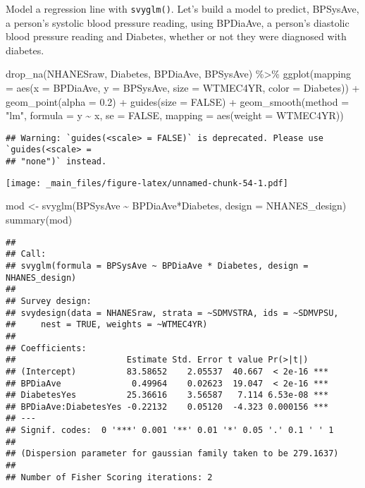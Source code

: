 \documentclass[
]{book}
\newenvironment{Shaded}{\begin{snugshade}}{\end{snugshade}}
\newcommand{\AttributeTok}[1]{\textcolor[rgb]{0.77,0.63,0.00}{#1}}
\newcommand{\ConstantTok}[1]{\textcolor[rgb]{0.00,0.00,0.00}{#1}}
\newcommand{\FloatTok}[1]{\textcolor[rgb]{0.00,0.00,0.81}{#1}}
\newcommand{\FunctionTok}[1]{\textcolor[rgb]{0.00,0.00,0.00}{#1}}
\newcommand{\NormalTok}[1]{#1}
\newcommand{\OtherTok}[1]{\textcolor[rgb]{0.56,0.35,0.01}{#1}}
\newcommand{\SpecialCharTok}[1]{\textcolor[rgb]{0.00,0.00,0.00}{#1}}
\newcommand{\StringTok}[1]{\textcolor[rgb]{0.31,0.60,0.02}{#1}}
\theoremstyle{definition}
\theoremstyle{definition}
\theoremstyle{definition}
\theoremstyle{definition}
\theoremstyle{remark}
\begin{document}
Model a regression line with \texttt{svyglm()}. Let's build a model to predict, BPSysAve, a person's systolic blood pressure reading, using BPDiaAve, a person's diastolic blood pressure reading and Diabetes, whether or not they were diagnosed with diabetes.

\begin{Shaded}
\begin{Highlighting}[]
\FunctionTok{drop\_na}\NormalTok{(NHANESraw, Diabetes, BPDiaAve, BPSysAve) }\SpecialCharTok{\%\textgreater{}\%}
\FunctionTok{ggplot}\NormalTok{(}\AttributeTok{mapping =} \FunctionTok{aes}\NormalTok{(}\AttributeTok{x =}\NormalTok{ BPDiaAve, }\AttributeTok{y =}\NormalTok{ BPSysAve, }\AttributeTok{size =}\NormalTok{ WTMEC4YR, }\AttributeTok{color =}\NormalTok{ Diabetes)) }\SpecialCharTok{+} 
    \FunctionTok{geom\_point}\NormalTok{(}\AttributeTok{alpha =} \FloatTok{0.2}\NormalTok{) }\SpecialCharTok{+} 
    \FunctionTok{guides}\NormalTok{(}\AttributeTok{size =} \ConstantTok{FALSE}\NormalTok{) }\SpecialCharTok{+} 
    \FunctionTok{geom\_smooth}\NormalTok{(}\AttributeTok{method =} \StringTok{"lm"}\NormalTok{, }\AttributeTok{formula =}\NormalTok{ y }\SpecialCharTok{\textasciitilde{}}\NormalTok{ x, }\AttributeTok{se =} \ConstantTok{FALSE}\NormalTok{, }\AttributeTok{mapping =} \FunctionTok{aes}\NormalTok{(}\AttributeTok{weight =}\NormalTok{ WTMEC4YR))}
\end{Highlighting}
\end{Shaded}

\begin{verbatim}
## Warning: `guides(<scale> = FALSE)` is deprecated. Please use `guides(<scale> =
## "none")` instead.
\end{verbatim}

\texttt{[image: \_main\_files/figure-latex/unnamed-chunk-54-1.pdf]}

\begin{Shaded}
\begin{Highlighting}[]
\NormalTok{mod }\OtherTok{\textless{}{-}} \FunctionTok{svyglm}\NormalTok{(BPSysAve }\SpecialCharTok{\textasciitilde{}}\NormalTok{ BPDiaAve}\SpecialCharTok{*}\NormalTok{Diabetes, }\AttributeTok{design =}\NormalTok{ NHANES\_design)}
\FunctionTok{summary}\NormalTok{(mod)}
\end{Highlighting}
\end{Shaded}

\begin{verbatim}
## 
## Call:
## svyglm(formula = BPSysAve ~ BPDiaAve * Diabetes, design = NHANES_design)
## 
## Survey design:
## svydesign(data = NHANESraw, strata = ~SDMVSTRA, ids = ~SDMVPSU, 
##     nest = TRUE, weights = ~WTMEC4YR)
## 
## Coefficients:
##                      Estimate Std. Error t value Pr(>|t|)    
## (Intercept)          83.58652    2.05537  40.667  < 2e-16 ***
## BPDiaAve              0.49964    0.02623  19.047  < 2e-16 ***
## DiabetesYes          25.36616    3.56587   7.114 6.53e-08 ***
## BPDiaAve:DiabetesYes -0.22132    0.05120  -4.323 0.000156 ***
## ---
## Signif. codes:  0 '***' 0.001 '**' 0.01 '*' 0.05 '.' 0.1 ' ' 1
## 
## (Dispersion parameter for gaussian family taken to be 279.1637)
## 
## Number of Fisher Scoring iterations: 2
\end{verbatim}
\end{document}
